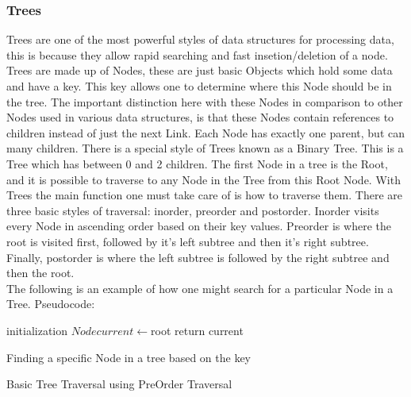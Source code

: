 \documentclass[10pt,twocolumn]{IEEEtran}
\begin{document}
\subsubsection{Trees}
Trees are one of the most powerful styles of data structures for processing data, this is because they allow rapid searching and fast insetion/deletion of a node. Trees are made up of Nodes, these are just basic Objects which hold some data and have a key. This key allows one to determine where this Node should be in the tree. The important distinction here with these Nodes in comparison to other Nodes used in various data structures, is that these Nodes contain references to children instead of just the next Link. Each Node has exactly one parent, but can many children. There is a special style of Trees known as a Binary Tree. This is a Tree which has between 0 and 2 children. The first Node in a tree is the Root, and it is possible to traverse to any Node in the Tree from this Root Node.
With Trees the main function one must take care of is how to traverse them. There are three basic styles of traversal: inorder, preorder and postorder. Inorder visits every Node in ascending order based on their key values. Preorder is where the root is visited first, followed by it's left subtree and then it's right subtree. Finally, postorder is where the left subtree is followed by the right subtree and then the root. \\
The following is an example of how one might search for a particular Node in a Tree.
Pseudocode:
\IncMargin{1em}
\begin{algorithm}
	\SetAlgoLined
	initialization\;
	$Node current \longleftarrow$root\;
return current\;
\caption{Finding a specific Node in a tree based on the key}
\end{algorithm}\DecMargin{1em}

\IncMargin{1em}
\begin{algorithm}
	\SetAlgoLined
		
\caption{Basic Tree Traversal using PreOrder Traversal}
\end{algorithm}\DecMargin{1em}
\end{document}
